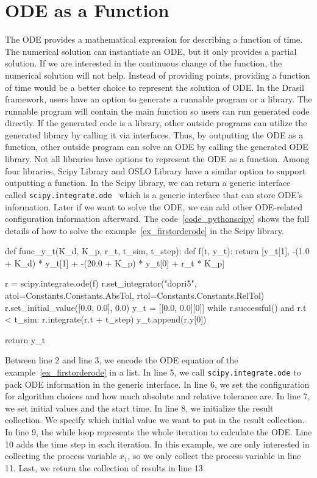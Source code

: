 \section{ODE as a Function}
The ODE provides a mathematical expression for describing a function of time. The numerical solution can instantiate an ODE, but it only provides a partial solution. If we are interested in the continuous change of the function, the numerical solution will not help. Instead of providing points, providing a function of time would be a better choice to represent the solution of ODE. In the Drasil framework, users have an option to generate a runnable program or a library. The runnable program will contain the main function so users can run generated code directly. If the generated code is a library, other outside programs can utilize the generated library by calling it via interfaces. Thus, by outputting the ODE as a function, other outside program can solve an ODE by calling the generated ODE library. Not all libraries have options to represent the ODE as a function. Among four libraries, Scipy Library and OSLO Library have a similar option to support outputting a function. In the Scipy library, we can return a generic interface called \verb|scipy.integrate.ode|~\citep{scipyfun} which is a generic interface that can store ODE's information. Later if we want to solve the ODE, we can add other ODE-related configuration information afterward. The code~\ref{code_pythonscipy} shows the full details of how to solve the example~\ref{ex_firstorderode} in the Scipy library.

\begin{listing}[ht]
\begin{python1}
def func_y_t(K_d, K_p, r_t, t_sim, t_step):
    def f(t, y_t):
        return [y_t[1], -(1.0 + K_d) * y_t[1] + -(20.0 + K_p) * y_t[0] + r_t * K_p]
    
    r = scipy.integrate.ode(f)
    r.set_integrator("dopri5", atol=Constants.Constants.AbsTol, rtol=Constants.Constants.RelTol)
    r.set_initial_value([0.0, 0.0], 0.0)
    y_t = [[0.0, 0.0][0]]
    while r.successful() and r.t < t_sim:
        r.integrate(r.t + t_step)
        y_t.append(r.y[0])
    
    return y_t
\end{python1}
\label{code_pythonscipy}
\end{listing}

Between line 2 and line 3, we encode the ODE equation of the example~\ref{ex_firstorderode} in a list. In line 5, we call \verb|scipy.integrate.ode| to pack ODE information in the generic interface. In line 6, we set the configuration for algorithm choices and how much absolute and relative tolerance are. In line 7, we set initial values and the start time. In line 8, we initialize the result collection. We specify which initial value we want to put in the result collection. In line 9, the while loop represents the whole iteration to calculate the ODE.  Line 10 adds the time step in each iteration. In this example, we are only interested in collecting the process variable $x_1$, so we only collect the process variable in line 11. Last, we return the collection of results in line 13.

